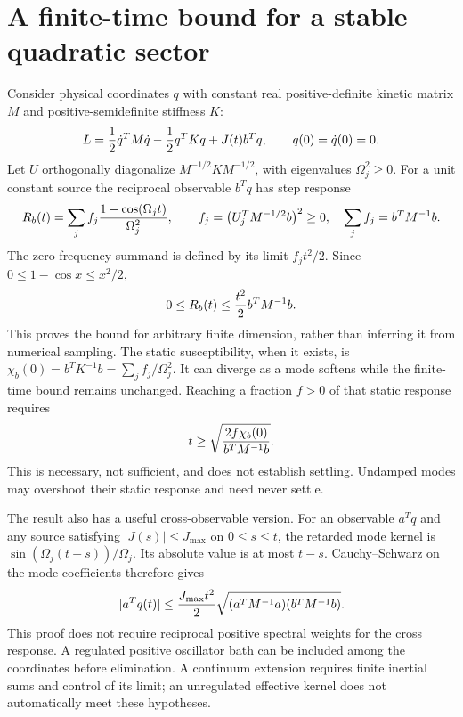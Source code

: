 \documentclass[11pt]{article}
\begin{document}
\section{A finite-time bound for a stable quadratic sector}
Consider physical coordinates $q$ with constant real positive-definite
kinetic matrix $M$ and positive-semidefinite stiffness $K$:
\begin{equation}
 L={1\over2}\dot q^TM\dot q-{1\over2}q^TKq
                +J(t)b^Tq,\qquad q(0)=\dot q(0)=0.
 \label{pr:system}
\end{equation}
Let $U$ orthogonally diagonalize $M^{-1/2}KM^{-1/2}$, with eigenvalues
$\Omega_j^2\geq0$. For a unit constant source the reciprocal observable
$b^Tq$ has step response
\begin{equation}
 R_b(t)=\sum_j f_j{1-\cos(\Omega_jt)\over\Omega_j^2},\qquad
 f_j=\bigl(U_j^TM^{-1/2}b\bigr)^2\geq0,\quad
 \sum_j f_j=b^TM^{-1}b.
 \label{pr:step}
\end{equation}
The zero-frequency summand is defined by its limit $f_jt^2/2$.
Since $0\leq1-\cos x\leq x^2/2$,
\begin{equation}
 0\leq R_b(t)\leq {t^2\over2}b^TM^{-1}b.
 \label{pr:bound}
\end{equation}
This proves the bound for arbitrary finite dimension, rather than inferring
it from numerical sampling. The static susceptibility, when it exists, is
$\chi_b(0)=b^TK^{-1}b=\sum_j f_j/\Omega_j^2$. It can diverge as a
mode softens while the finite-time bound remains unchanged.
Reaching a fraction $f>0$ of that static response requires
\begin{equation}
 t\geq\sqrt{{2f\chi_b(0)\over b^TM^{-1}b}}.
 \label{pr:minimumtime}
\end{equation}
This is necessary, not sufficient, and does not establish settling.
Undamped modes may overshoot their static response and need never settle.

The result also has a useful cross-observable version. For an observable
$a^Tq$ and any source satisfying $|J(s)|\leq J_{\max}$ on $0\leq s\leq t$,
the retarded mode kernel is $\sin(\Omega_j(t-s))/\Omega_j$.
Its absolute value is at most $t-s$. Cauchy--Schwarz on the mode
coefficients therefore gives
\begin{equation}
 |a^Tq(t)|\leq {J_{\max}t^2\over2}
       \sqrt{(a^TM^{-1}a)(b^TM^{-1}b)}.
 \label{pr:cross}
\end{equation}
This proof does not require reciprocal positive spectral weights for the
cross response. A regulated positive oscillator bath can be included among
the coordinates before elimination. A continuum extension requires finite
inertial sums and control of its limit; an unregulated effective kernel
does not automatically meet these hypotheses.
\end{document}
